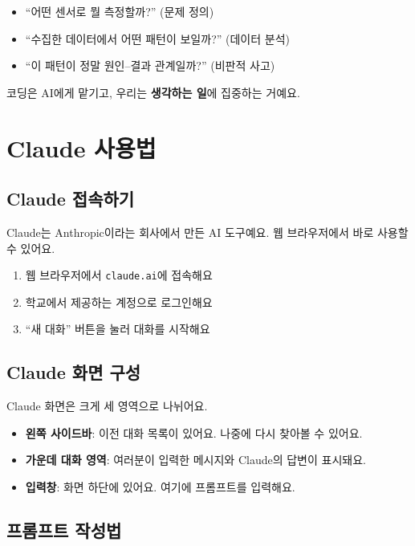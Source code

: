 \documentclass[11pt, a4paper]{article}
\begin{document}
\begin{itemize}[leftmargin=1.5em]
\item ``어떤 센서로 뭘 측정할까?'' (문제 정의)
\item ``수집한 데이터에서 어떤 패턴이 보일까?'' (데이터 분석)
\item ``이 패턴이 정말 원인--결과 관계일까?'' (비판적 사고)
\end{itemize}

코딩은 AI에게 맡기고, 우리는 \textbf{생각하는 일}에 집중하는 거예요.

\section{Claude 사용법}

\subsection{Claude 접속하기}

Claude는 Anthropic이라는 회사에서 만든 AI 도구예요. 웹 브라우저에서 바로 사용할 수 있어요.

\begin{enumerate}[leftmargin=1.5em]
\item 웹 브라우저에서 \texttt{claude.ai}에 접속해요
\item 학교에서 제공하는 계정으로 로그인해요
\item ``새 대화'' 버튼을 눌러 대화를 시작해요
\end{enumerate}

\subsection{Claude 화면 구성}

Claude 화면은 크게 세 영역으로 나뉘어요.

\begin{itemize}[leftmargin=1.5em]
\item \textbf{왼쪽 사이드바}: 이전 대화 목록이 있어요. 나중에 다시 찾아볼 수 있어요.
\item \textbf{가운데 대화 영역}: 여러분이 입력한 메시지와 Claude의 답변이 표시돼요.
\item \textbf{입력창}: 화면 하단에 있어요. 여기에 프롬프트를 입력해요.
\end{itemize}

\subsection{프롬프트 작성법}
\end{document}
